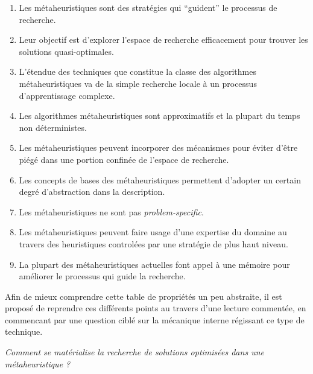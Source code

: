 \begin{enumerate}[label=(\alph*),labelindent=\parindent,leftmargin=*]
	\item Les métaheuristiques sont des stratégies qui \enquote{guident} le processus de recherche. \label{enum_meta_a}
	\item Leur objectif est d'explorer l'espace de recherche efficacement pour trouver les solutions quasi-optimales. \label{enum_meta_b}
	\item L'étendue des techniques que constitue la classe des algorithmes métaheuristiques va de la simple recherche locale à un processus d'apprentissage complexe. \label{enum_meta_c}
	\item Les algorithmes métaheuristiques sont approximatifs et la plupart du temps non déterministes. \label{enum_meta_d}
	\item Les métaheuristiques peuvent incorporer des mécanismes pour éviter d'être piégé dans une portion confinée de l'espace de recherche. \label{enum_meta_e}
	\item Les concepts de bases des métaheuristiques permettent d'adopter un certain degré d'abstraction dans la description. \label{enum_meta_f}
	\item Les métaheuristiques ne sont pas \textit{problem-specific}. \label{enum_meta_g}
	\item Les métaheuristiques peuvent faire usage d'une expertise du domaine au travers des heuristiques controlées par une stratégie de plus haut niveau. \label{enum_meta_h}
	\item La plupart des métaheuristiques actuelles font appel à une mémoire pour améliorer le processus qui guide la recherche. \label{enum_meta_i}
\end{enumerate}

Afin de mieux comprendre cette table de propriétés un peu abstraite, il est proposé de reprendre ces différents points au travers d'une lecture commentée, en commencant par une question ciblé sur la mécanique interne régissant ce type de technique.

\textit{Comment se matérialise la recherche de solutions optimisées dans une métaheuristique ?}

